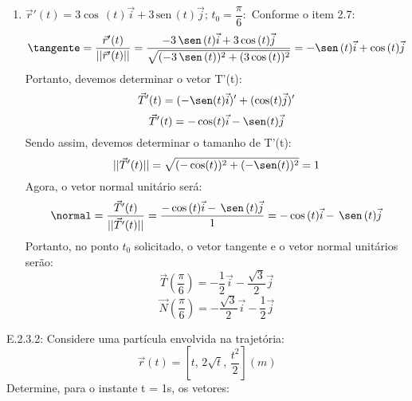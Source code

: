 \begin{enumerate}
\item $\vec r'(t)=3\cos\,(t)\vec i+3\,\mathrm{sen}\,(t)\vec j;\,t_0=\dfrac{\pi}{6}:$ Conforme o item 2.7:
\begin{equation*}
	\tangente=\dfrac{\vec r'(t)}{\vert\vert \vec r'(t)\vert\vert}=\dfrac{-3\,\sen\,(t)\vec i+3\cos\,(t)\vec j}{\sqrt{(-3\,\sen\,(t))^2+(3\cos\,(t))^2}}=-\sen\,(t)\vec i+\cos\,(t)\vec j
\end{equation*}
Portanto, devemos determinar o vetor T'(t):
\begin{equation*}
	\vec T'(t)=(-\sen(t)\vec i)'+(\cos (t)\vec j)'
\end{equation*}
\begin{equation*}
	\vec T'(t)=-\cos(t)\vec i -\sen (t)\vec j
\end{equation*}
Sendo assim, devemos determinar o tamanho de T'(t):
\begin{equation*}
	\vert\vert \vec T'(t)\vert\vert=\sqrt{(-\cos(t))^2 +(-\sen (t))^2} = 1
\end{equation*}
Agora, o vetor normal unitário será:
\begin{equation*}
	\normal=\dfrac{\vec T'(t)}{\vert\vert \vec T'(t)\vert\vert}=\dfrac{-\cos\,(t)\vec i-\,\sen\,(t)\vec j}{1}=-\cos\,(t)\vec i-\,\sen\,(t)\vec j
\end{equation*}
Portanto, no ponto $t_0$ solicitado, o vetor tangente e o vetor normal unitários serão:
\begin{equation*}
	\vec{T}\left(\dfrac{\pi}{6}\right)=-\dfrac{1}{2}\vec i-\dfrac{\sqrt{3}}{2}\vec j
\end{equation*}
\begin{equation*}
	\vec{N}\left(\dfrac{\pi}{6}\right)=-\dfrac{\sqrt{3}}{2}\vec i-\dfrac{1}{2}\vec j
\end{equation*}
\end{enumerate}
E.2.3.2: Considere uma partícula envolvida na trajetória:
\begin{equation*}
	\vec r(t)=\left[t,\,2\sqrt{t},\,\dfrac{t^2}{2}\right] (m)
\end{equation*}
Determine, para o instante t = 1s, os vetores:
